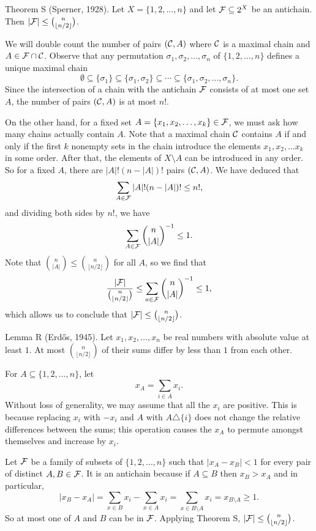 \parenproclaim Theorem S (Sperner, {\rm 1928}). Let $X = \{1,2,\ldots, n\}$ and let ${\cal F}\subseteq 2^X$ be an
antichain. Then $|{\cal F}|\leq {n\choose \lfloor n/2\rfloor}$.

\proof We will double count the number of pairs $({\cal C}, A)$ where ${\cal C}$ is a maximal chain and
$A\in {\cal F}\cap{\cal C}$. Observe that any permutation $\sigma_1, \sigma_2, \ldots, \sigma_n$
of $\{1,2,\ldots,n\}$ defines a unique maximal chain
$$\emptyset \subseteq \{\sigma_1\} \subseteq \{\sigma_1,\sigma_2\}\subseteq \cdots\subseteq\{\sigma_1,\sigma_2,
\ldots,\sigma_n\}.$$
Since the intersection of a chain with the antichain ${\cal F}$ consists of at most one set $A$, the number of
pairs $({\cal C},A)$ is at most $n!$.

On the other hand, for a fixed set $A = \{x_1, x_2,\ldots, x_k\}\in {\cal F}$,
we must ask how many chains actually contain $A$. Note that a maximal chain ${\cal C}$ contains $A$ if and only if
the first $k$ nonempty sets in the chain introduce the elements $x_1,x_2,\ldots x_k$ in some order. After
that, the elements of $X\setminus A$ can be introduced in any order. So for a fixed $A$, there are $|A|!(n-|A|)!$
pairs $({\cal C},A)$. We have deduced that
$$\sum_{A\in {\cal F}} |A|!(n-|A|)! \leq n!,$$
and dividing both sides by $n!$, we have
$$\sum_{A\in {\cal F}} {n\choose |A|}^{-1} \leq 1.$$
Note that ${n\choose |A|}\leq {n\choose \lfloor n/2\rfloor}$ for all $A$, so we find that
$${|{\cal F}|\over {n\choose \lfloor n/2\rfloor}} \leq \sum_{a\in {\cal F}}{n\choose |A|}^{-1}\leq 1,$$
which allows us to conclude that $|{\cal F}|\leq {n\choose \lfloor n/2\rfloor}$.\slug

\parenproclaim Lemma R (Erd\H os, {\rm 1945}). Let $x_1, x_2, \ldots, x_n$ be real numbers with absolute
value at least $1$. At most ${n\choose \lfloor n/2\rfloor}$ of their sums differ by less than $1$ from
each other.

\proof For $A\subseteq \{1,2,\ldots,n\}$, let
$$x_A = \sum_{i\in A} x_i.$$
Without loss of generality, we may assume that all the $x_i$ are positive. This is because replacing
$x_i$ with $-x_i$ and $A$ with $A\triangle \{i\}$ does not change the relative differences between
the sums; this operation causes the $x_A$ to permute amongst themselves and increase by $x_i$.

Let ${\cal F}$ be a family of subsets of $\{1,2,\ldots,n\}$ such that $|x_A - x_B|<1$ for every pair of distinct
$A,B\in {\cal F}$. It is an antichain because if $A\subseteq B$ then $x_B>x_A$ and in particular,
$$|x_B - x_A| = \sum_{x\in B}x_i - \sum_{x\in A} x_i = \sum_{x\in B\setminus A} x_i = x_{B\setminus A}\geq 1.$$
So at most one of $A$ and $B$ can be in ${\cal F}$. Applying Theorem S, $|{\cal F}|\leq {n\choose \lfloor n/2\rfloor}$.\slug

